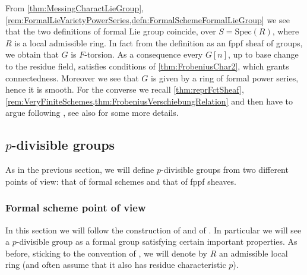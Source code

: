 \documentclass[../Main]{subfiles}
\begin{document}
\begin{rem}
	From 
	\cref{thm:MessingCharactLieGroup},
	\cref{rem:FormalLieVarietyPowerSeries,defn:FormalSchemeFormalLieGroup}
	we see that the two definitions of formal Lie group coincide, over
	$S = \mathrm{Spec}(R)$, where $R$ is a local admissible ring.
	In fact from the definition as an fppf sheaf of groups,
	we obtain that $G$ is $F$-torsion.
	As a consequence every $G[n]$, up to base
	change to the residue field, satisfies conditions of \cref{thm:FrobeniusChar2},
	which grants connectedness.
	Moreover we see that $G$ is given by a ring of formal power series,
	hence it is smooth.
	For the converse we recall
	\cref{thm:reprFctSheaf},
	\cref{rem:VeryFiniteSchemes,thm:FrobeniusVerschiebungRelation}
	and then have to argue following \cite[proposition 1]{TatePC}, see
	also \cite[Chapter II, \S2, theorem 2.1.7]{Messing} for some more details.
\end{rem}



\subsection{\texorpdfstring{$p$}{p}-divisible groups}
As in the previous section, we will define $p$-divisible groups
from two different points of view: that of formal schemes
and that of fppf sheaves.



\subsubsection{Formal scheme point of view}
In this section we will follow the construction of \cite[\S2]{TatePC} and
of \cite[\S6]{Shatz}. 
In particular we will see a $p$-divisible group as a formal group
satisfying certain important properties.
As before, sticking to the convention of \cite{Shatz}, we will 
denote by $R$ an admissible local ring (and often assume that
it also has residue characteristic $p$).
\end{document}
